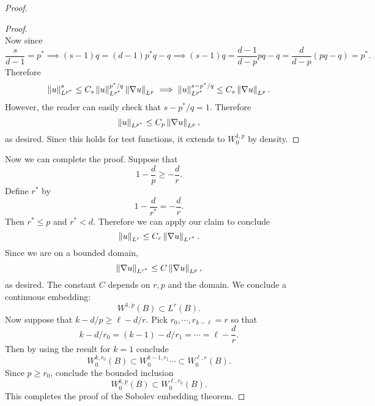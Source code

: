 \documentclass{amsart}
\begin{document}
\begin{proof}
\begin{claim}
\begin{proof}
\begin{equation*}
  \end{equation*}
  Now since
  \begin{equation*}
    \frac{s}{d-1}=p^{*}\implies (s-1)q=(d-1)p^{*}q-q\implies (s-1)q=\frac{d-1}{d-p}pq-q=\frac{d}{d-p}(pq-q)=p^{*}.
  \end{equation*}
  Therefore
  \begin{equation*}
    \left\lVert u\right\rVert_{L^{p^{*}}}^{s}\le C_{s}\left\lVert u\right\rVert_{L^{p^{*}}}^{p^{*}/q}\left\lVert\nabla u\right\rVert_{L^{p}}\implies \left\lVert u\right\rVert_{L^{p^{*}}}^{s-p^{*}/q}\le C_{s}\left\lVert\nabla u\right\rVert_{L^{p}}.
  \end{equation*}
  However, the reader can easily check that $s-p^{*}/q=1$. Therefore
  \begin{equation*}
    \left\lVert u\right\rVert_{L^{p^{*}}}\le C_{p}\left\lVert\nabla u\right\rVert_{L^{p}},
  \end{equation*}
  as desired. Since this holds for test functions, it extends to $W^{1,p}_{0}$ by density. \end{proof}
\end{claim}

Now we can complete the proof. Suppose that
\begin{equation*}
  1-\frac{d}{p}\ge -\frac{d}{r}.
\end{equation*}
Define $r^{*}$ by
\begin{equation*}
  1-\frac{d}{r^{*}}=-\frac{d}{r}.
\end{equation*}
Then $r^{*}\le p$ and $r^{*}<d$. Therefore we can apply our claim to conclude
\begin{equation*}
  \left\lVert u\right\rVert_{L^{r}}\le C_{r}\left\lVert\nabla u\right\rVert_{L^{r^{*}}}.
\end{equation*}
Since we are on a bounded domain,
\begin{equation*}
  \left\lVert\nabla u\right\rVert_{L^{r^{*}}}\le C\left\lVert\nabla u\right\rVert_{L^{p}},
\end{equation*}
as desired. The constant $C$ depends on $r,p$ and the domain. We conclude a continuous embedding:
\begin{equation*}
  W^{1,p}(B)\subset L^{r}(B).
\end{equation*}
Now suppose that $k-d/p\ge \ell-d/r$. Pick $r_{0},\cdots,r_{k-\ell}=r$ so that
\begin{equation*}
  k-d/r_{0}=(k-1)-d/r_{1}=\cdots=\ell-\frac{d}{r}.
\end{equation*}
Then by using the result for $k=1$ conclude
\begin{equation*}
  W^{k,r_{0}}_{0}(B)\subset W^{k-1,r_{1}}_{0}\cdots \subset W^{\ell,r}_{0}(B).
\end{equation*}
Since $p\ge r_{0}$, conclude the bounded inclusion
\begin{equation*}
  W^{k,p}_{0}(B)\subset W^{\ell,r_{0}}_{0}(B).
\end{equation*}
This completes the proof of the Sobolev embedding theorem. 
\end{proof}
\end{document}
